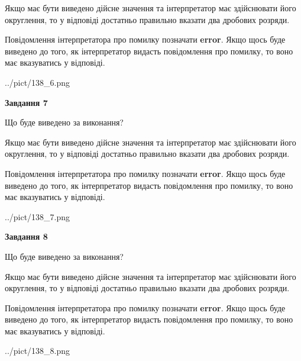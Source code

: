 \documentclass[12pt, ukrainian]{article}
\begin{document}
{\begin {Large}
Якщо має бути виведено дійсне значення та інтерпретатор має здійснювати його округлення, 
то у відповіді достатньо правильно вказати два дробових розряди.

Повідомлення інтерпретатора про помилку позначати \textbf{error}.
Якщо щось буде виведено до того, як інтерпретатор видасть повідомлення про помилку, 
то воно має вказуватись у відповіді. \par

\begin{center}
	{../pict/138_6.png}
\end{center}
\newpage

{\begin {center}\textbf{Завдання 7}\end {center}}\par
Що буде виведено за виконання? \par

Якщо має бути виведено дійсне значення та інтерпретатор має здійснювати його округлення, 
то у відповіді достатньо правильно вказати два дробових розряди.

Повідомлення інтерпретатора про помилку позначати \textbf{error}.
Якщо щось буде виведено до того, як інтерпретатор видасть повідомлення про помилку, 
то воно має вказуватись у відповіді. \par

\begin{center}
	{../pict/138_7.png}
\end{center}
\newpage

{\begin {center}\textbf{Завдання 8}\end {center}}\par
Що буде виведено за виконання? \par

Якщо має бути виведено дійсне значення та інтерпретатор має здійснювати його округлення, 
то у відповіді достатньо правильно вказати два дробових розряди.

Повідомлення інтерпретатора про помилку позначати \textbf{error}.
Якщо щось буде виведено до того, як інтерпретатор видасть повідомлення про помилку, 
то воно має вказуватись у відповіді. \par

\begin{center}
	{../pict/138_8.png}
\end{center}
\newpage


\end{Large}}
\end{document}
